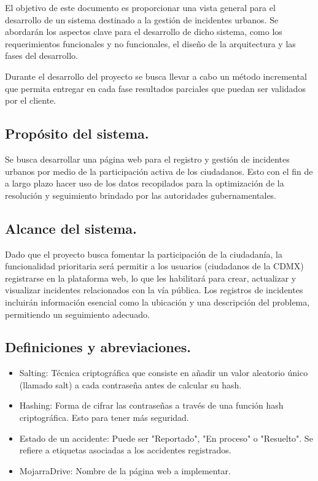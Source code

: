 El objetivo de este documento es proporcionar una vista general para el desarrollo de un sistema destinado a la gestión de incidentes urbanos. Se abordarán los aspectos clave para el desarrollo de dicho sistema, como los requerimientos funcionales y no funcionales,  el diseño de la arquitectura y las fases del desarrollo.

Durante el desarrollo del proyecto se busca llevar a cabo un método incremental que permita entregar en cada fase resultados parciales que puedan ser validados por el cliente.

\subsection{Propósito del sistema.}

Se busca desarrollar una página web para el registro y gestión de incidentes urbanos por medio de la participación activa de los ciudadanos. Esto con el fin de a largo plazo hacer uso de los datos recopilados para la optimización de la resolución y seguimiento brindado por las autoridades gubernamentales.

\subsection{Alcance del sistema.}

Dado que el proyecto busca fomentar la participación de la ciudadanía, la funcionalidad prioritaria será permitir a los usuarios (ciudadanos de la CDMX) registrarse en la plataforma web, lo que les habilitará para crear, actualizar y visualizar incidentes relacionados con la vía pública. Los registros de incidentes incluirán información esencial como la ubicación y una descripción del problema, permitiendo un seguimiento adecuado.

\subsection{Definiciones y abreviaciones.}
\begin{itemize}
    \item Salting: Técnica criptográfica que consiste en añadir un valor aleatorio único (llamado salt) a cada contraseña antes de calcular su hash. 
    \item Hashing: Forma de cifrar las contraseñas a través de una función hash criptográfica. Esto para tener más seguridad.
    \item Estado de un accidente: Puede ser "Reportado", "En proceso" o "Resuelto". Se refiere a etiquetas asociadas a los accidentes registrados.
    \item MojarraDrive: Nombre de la página web a implementar.
\end{itemize}